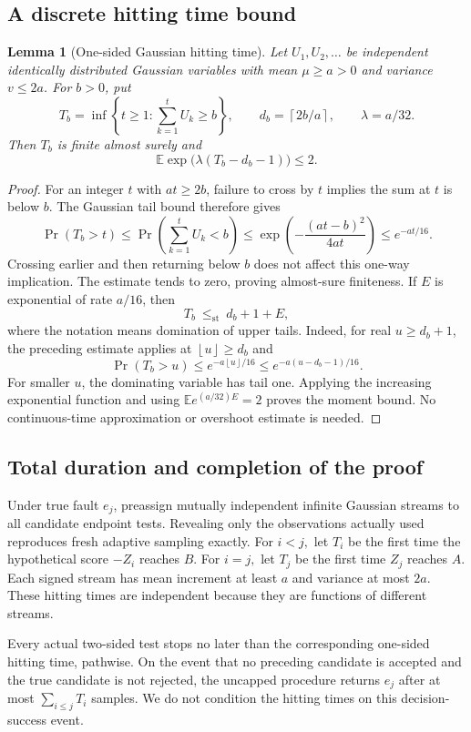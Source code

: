 \documentclass[11pt,letterpaper]{article}
\newtheorem{lemma}[theorem]{Lemma}
\newcommand{\ceil}[1]{\left\lceil #1\right\rceil}
\newcommand{\floor}[1]{\left\lfloor #1\right\rfloor}
\begin{document}
\subsection{A discrete hitting time bound}
\begin{lemma}[One-sided Gaussian hitting time]\label{lem:hitting}
Let $U_1,U_2,\ldots$ be independent identically distributed Gaussian variables with mean $\mu\ge a>0$ and variance $v\le2a$. For $b>0$, put
\[
 T_b=\inf\left\{t\ge1:\sum_{k=1}^tU_k\ge b\right\},\qquad
 d_b=\ceil{2b/a},\qquad \lambda=a/32.
\]
Then $T_b$ is finite almost surely and
\[
 \mathbb E\exp\bigl(\lambda(T_b-d_b-1)\bigr)\le2.
\]
\end{lemma}
\begin{proof}
For an integer $t$ with $at\ge2b$, failure to cross by $t$ implies the sum at $t$ is below $b$. The Gaussian tail bound therefore gives
\[
 \Pr(T_b>t)
 \le\Pr\left(\sum_{k=1}^tU_k<b\right)
 \le\exp\left(-\frac{(at-b)^2}{4at}\right)
 \le e^{-at/16}.
\]
Crossing earlier and then returning below $b$ does not affect this one-way implication. The estimate tends to zero, proving almost-sure finiteness. If $E$ is exponential of rate $a/16$, then
\[
 T_b\ \le_{\mathrm{st}}\ d_b+1+E,
\]
where the notation means domination of upper tails. Indeed, for real $u\ge d_b+1$, the preceding estimate applies at $\floor{u}\ge d_b$ and
\[
 \Pr(T_b>u)\le e^{-a\floor{u}/16}
 \le e^{-a(u-d_b-1)/16}.
\]
For smaller $u$, the dominating variable has tail one. Applying the increasing exponential function and using $\mathbb E e^{(a/32)E}=2$ proves the moment bound. No continuous-time approximation or overshoot estimate is needed.
\end{proof}

\subsection{Total duration and completion of the proof}
Under true fault $e_j$, preassign mutually independent infinite Gaussian streams to all candidate endpoint tests. Revealing only the observations actually used reproduces fresh adaptive sampling exactly. For $i<j,$ let $T_i$ be the first time the hypothetical score $-Z_i$ reaches $B$. For $i=j,$ let $T_j$ be the first time $Z_j$ reaches $A$. Each signed stream has mean increment at least $a$ and variance at most $2a$. These hitting times are independent because they are functions of different streams.

Every actual two-sided test stops no later than the corresponding one-sided hitting time, pathwise. On the event that no preceding candidate is accepted and the true candidate is not rejected, the uncapped procedure returns $e_j$ after at most $\sum_{i\le j}T_i$ samples. We do not condition the hitting times on this decision-success event.
\end{document}
